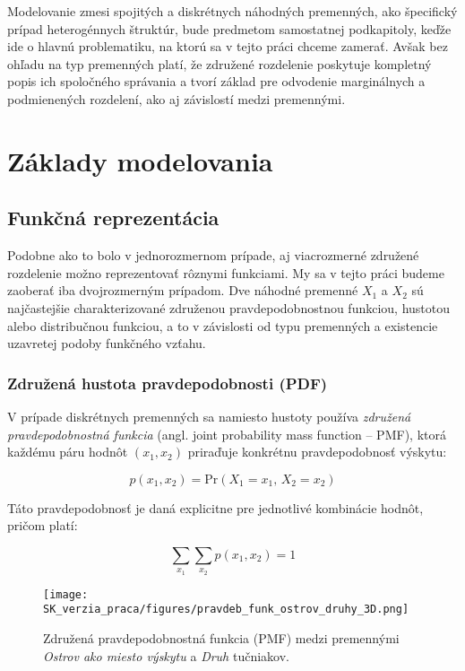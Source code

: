 Modelovanie zmesi spojitých a diskrétnych náhodných premenných, ako špecifický prípad heterogénnych štruktúr, bude predmetom samostatnej podkapitoly, keďže ide o hlavnú problematiku, na ktorú sa v tejto práci chceme zamerať. Avšak bez ohľadu na typ premenných platí, že združené rozdelenie poskytuje kompletný popis ich spoločného správania a tvorí základ pre odvodenie marginálnych a podmienených rozdelení, ako aj závislostí medzi premennými.


\section{Základy modelovania}\label{sec:joint_zaklady_modelovania}

\subsection{Funkčná reprezentácia}\label{subsec:joint_representation}

Podobne ako to bolo v jednorozmernom prípade, aj viacrozmerné združené rozdelenie možno reprezentovať rôznymi funkciami. My sa v tejto práci budeme zaoberať iba dvojrozmerným prípadom. Dve náhodné premenné $X_1$ a $X_2$ sú najčastejšie charakterizované združenou pravdepodobnostnou funkciou, hustotou alebo distribučnou funkciou, a to v závislosti od typu premenných a existencie uzavretej podoby funkčného vzťahu.

\subsubsection{Združená hustota pravdepodobnosti (PDF)}\label{subsec:joint_pdf}

V prípade diskrétnych premenných sa namiesto hustoty používa \textit{združená pravdepodobnostná funkcia} (angl. joint probability mass function – PMF), ktorá každému páru hodnôt $(x_1, x_2)$ priraďuje konkrétnu pravdepodobnosť výskytu: 

\begin{equation}
p(x_1, x_2) = \mathrm{Pr}(X_1 = x_1,\, X_2 = x_2)
\end{equation}

Táto pravdepodobnosť je daná explicitne pre jednotlivé kombinácie hodnôt, pričom platí:

\begin{equation}
\sum_{x_1} \sum_{x_2} p(x_1, x_2) = 1
\end{equation}

\begin{figure}[H]
    \centering
    \texttt{[image: SK\_verzia\_praca/figures/pravdeb\_funk\_ostrov\_druhy\_3D.png]}
    \caption{Združená pravdepodobnostná funkcia (PMF) medzi premennými \textit{Ostrov ako miesto výskytu} a \textit{Druh} tučniakov.}
    \label{fig:miesto_druh_joint_density}
\end{figure}

